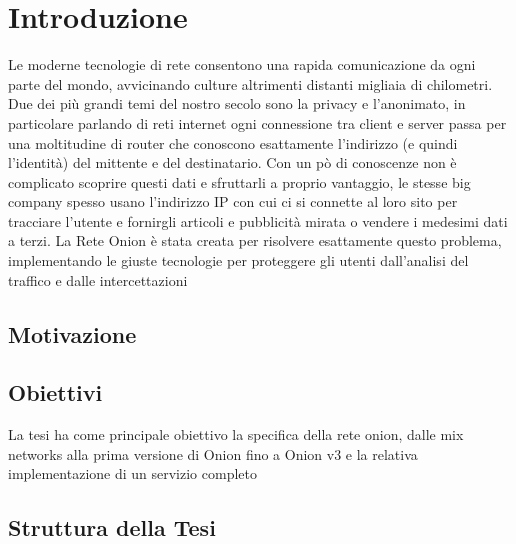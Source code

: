 \chapter{Introduzione}
\label{chap:intro}

Le moderne tecnologie di rete consentono una rapida comunicazione da ogni parte del mondo, avvicinando culture altrimenti distanti migliaia di chilometri. Due dei più grandi temi del nostro secolo sono la privacy e l'anonimato, in particolare parlando di reti internet ogni connessione tra client e server passa per una moltitudine di router che conoscono esattamente l'indirizzo (e quindi l'identità) del mittente e del destinatario. Con un pò di conoscenze non è complicato scoprire questi dati e sfruttarli a proprio vantaggio, le stesse big company spesso usano l'indirizzo IP con cui ci si connette al loro sito per tracciare l'utente e fornirgli articoli e pubblicità mirata o vendere i medesimi dati a terzi. 
La Rete Onion è stata creata per risolvere esattamente questo problema, implementando le giuste tecnologie per proteggere gli utenti dall'analisi del traffico e dalle intercettazioni


\section{Motivazione}
\section{Obiettivi}

La tesi ha come principale obiettivo la specifica della rete onion, dalle mix networks alla prima versione di Onion fino a Onion v3 e la relativa implementazione di un servizio completo

\section{Struttura della Tesi}
